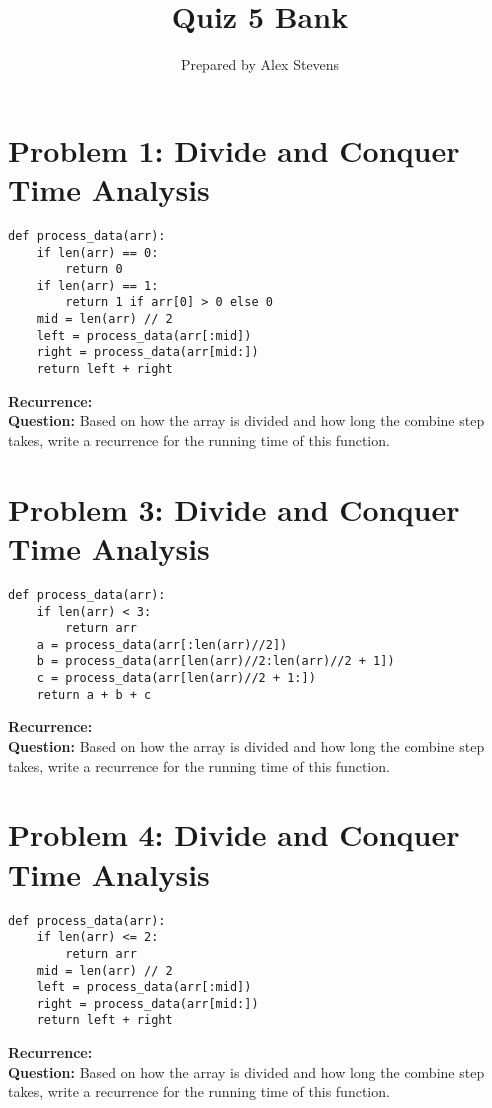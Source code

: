 \documentclass[12pt]{article}
\begin{document}
\title{Quiz 5 Bank}
\author{Prepared by Alex Stevens}
\date{}
\maketitle

\section*{Problem 1: Divide and Conquer Time Analysis}
\begin{verbatim}
def process_data(arr):
    if len(arr) == 0:
        return 0
    if len(arr) == 1:
        return 1 if arr[0] > 0 else 0
    mid = len(arr) // 2
    left = process_data(arr[:mid])
    right = process_data(arr[mid:])
    return left + right
\end{verbatim}
\textbf{Recurrence:} \underline{\hspace{10cm}} \\
\textbf{Question:} Based on how the array is divided and how long the combine step takes, write a recurrence for the running time of this function.

\vspace{2em}

\section*{Problem 3: Divide and Conquer Time Analysis}
\begin{verbatim}
def process_data(arr):
    if len(arr) < 3:
        return arr
    a = process_data(arr[:len(arr)//2])
    b = process_data(arr[len(arr)//2:len(arr)//2 + 1])
    c = process_data(arr[len(arr)//2 + 1:])
    return a + b + c
\end{verbatim}
\textbf{Recurrence:} \underline{\hspace{10cm}} \\
\textbf{Question:} Based on how the array is divided and how long the combine step takes, write a recurrence for the running time of this function.

\vspace{2em}

\section*{Problem 4: Divide and Conquer Time Analysis}
\begin{verbatim}
def process_data(arr):
    if len(arr) <= 2:
        return arr
    mid = len(arr) // 2
    left = process_data(arr[:mid])
    right = process_data(arr[mid:])
    return left + right
\end{verbatim}
\textbf{Recurrence:} \underline{\hspace{10cm}} \\
\textbf{Question:} Based on how the array is divided and how long the combine step takes, write a recurrence for the running time of this function.
\end{document}

